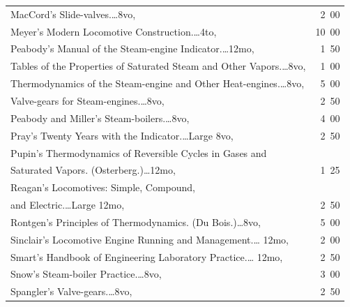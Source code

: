 \documentclass[a4paper,12pt]{book}[2004/02/16]
\theoremstyle{ilemma}
\theoremstyle{itheorem}
\theoremstyle{iother}
\theoremstyle{icorollary}
\theoremstyle{numcorollary}
\theoremstyle{idefinition}
\begin{document}
\begin{longtable}{@{}l@{ }r@{}}
MacCord's Slide-valves.\dotfill\ldots 8vo, &2\ 00\\

Meyer's Modern Locomotive Construction.\dotfill\ldots 4to, &10\ 00\\

Peabody's Manual of the Steam-engine Indicator.\dotfill\ldots 12mo, &1\ 50\\

\indent Tables of the Properties of Saturated Steam and Other
Vapors.\dotfill\ldots 8vo, &1\ 00\\

\indent Thermodynamics of the Steam-engine and Other
Heat-engines.\dotfill\ldots 8vo, &5\ 00\\

\indent Valve-gears for Steam-engines.\dotfill\ldots 8vo, &2\ 50\\

Peabody and Miller's Steam-boilers.\dotfill\ldots 8vo, &4\ 00\\

Pray's Twenty Years with the Indicator.\dotfill\ldots Large 8vo, &2\ 50\\

Pupin's Thermodynamics of Reversible Cycles in Gases and\\

\nopagebreak

\indent\indent Saturated Vapors. (Osterberg.)\dotfill\ldots 12mo, &1\ 25\\

Reagan's Locomotives: Simple, Compound,\\

\nopagebreak

\indent\indent and Electric.\dotfill\ldots Large 12mo, &2\ 50\\

Rontgen's Principles of Thermodynamics. (Du Bois.)\dotfill\ldots 8vo,
&5\ 00\\

Sinclair's Locomotive Engine Running and Management.\dotfill\ldots
12mo, &2\ 00\\

Smart's Handbook of Engineering Laboratory Practice.\dotfill\ldots
12mo, &2\ 50\\

Snow's Steam-boiler Practice.\dotfill\ldots 8vo, &3\ 00\\

Spangler's Valve-gears.\dotfill\ldots 8vo, &2\ 50\\


\end{longtable}
\end{document}
